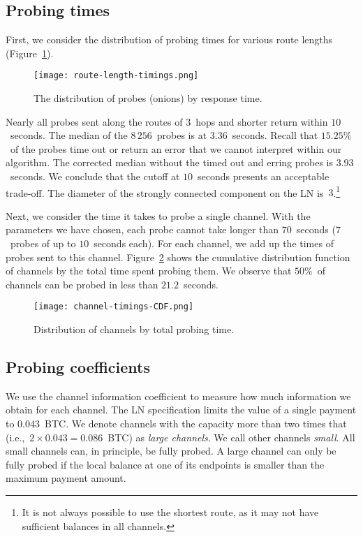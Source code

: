 \subsection{Probing times}

First, we consider the distribution of probing times for various route lengths (Figure~\ref{fig:route-length-timings}).

\begin{figure}[ht]
	\centering
	\texttt{[image: route-length-timings.png]}
	\caption{The distribution of probes (onions) by response time.}
	\label{fig:route-length-timings}
\end{figure}

Nearly all probes sent along the routes of $3$~hops and shorter return within $10$~seconds.
The median of the $8\,256$~probes is at $3.36$~seconds.
Recall that $15.25\%$~of the probes time out or return an error that we cannot interpret within our algorithm.
The corrected median without the timed out and erring probes is $3.93$~seconds.
We conclude that the cutoff at $10$~seconds presents an acceptable trade-off.
The diameter of the strongly connected component on the LN is~$3$.\footnote{It is not always possible to use the shortest route, as it may not have sufficient balances in all channels.}

Next, we consider the time it takes to probe a single channel.
With the parameters we have chosen, each probe cannot take longer than $70$~seconds ($7$~probes of up to $10$~seconds each).
For each channel, we add up the times of probes sent to this channel.
Figure~\ref{fig:channel-timings-CDF} shows the cumulative distribution function of channels by the total time spent probing them.
We observe that $50\%$~of channels can be probed in less than $21.2$~seconds.

\begin{figure}[ht]
	\centering
	\texttt{[image: channel-timings-CDF.png]}
	\caption{Distribution of channels by total probing time.}
	\label{fig:channel-timings-CDF}
\end{figure}


\subsection{Probing coefficients}

We use the channel information coefficient to measure how much information we obtain for each channel.
The LN specification limits the value of a single payment to $0.043$~BTC\@.
We denote channels with the capacity more than two times that (i.e.,~$2 \times 0.043 = 0.086$~BTC) as \textit{large channels}.
We call other channels \textit{small}.
All small channels can, in principle, be fully probed.
A large channel can only be fully probed if the local balance at one of its endpoints is smaller than the maximum payment amount.

